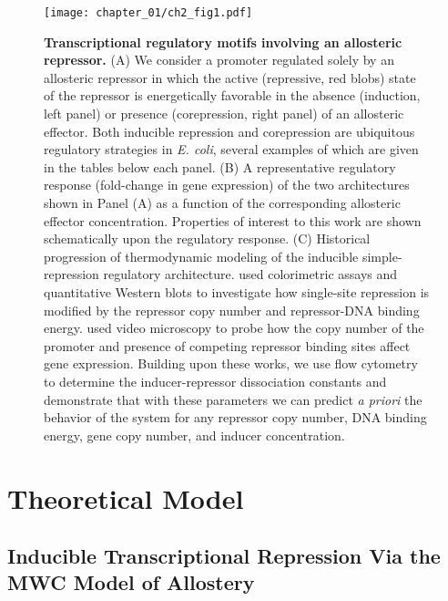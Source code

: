 \documentclass[12pt]{caltech_thesis}
\begin{document}
\hypertarget{fig:inducible_types}{%
\begin{figure}
\centering
\texttt{[image: chapter\_01/ch2\_fig1.pdf]}
\caption[{Transcriptional regulatory architectures involving an
allosteric repressor.}]{\textbf{Transcriptional regulatory motifs
involving an allosteric repressor.} (A) We consider a promoter regulated
solely by an allosteric repressor in which the active (repressive, red
blobs) state of the repressor is energetically favorable in the absence
(induction, left panel) or presence (corepression, right panel) of an
allosteric effector. Both inducible repression and corepression are
ubiquitous regulatory strategies in \emph{E. coli}, several examples of
which are given in the tables below each panel. (B) A representative
regulatory response (fold-change in gene expression) of the two
architectures shown in Panel (A) as a function of the corresponding
allosteric effector concentration. Properties of interest to this work
are shown schematically upon the regulatory response. (C) Historical
progression of thermodynamic modeling of the inducible simple-repression
regulatory architecture. \textcite{garcia2011} used colorimetric assays
and quantitative Western blots to investigate how single-site repression
is modified by the repressor copy number and repressor-DNA binding
energy. \textcite{brewster2014} used video microscopy to probe how the
copy number of the promoter and presence of competing repressor binding
sites affect gene expression. Building upon these works, we use flow
cytometry to determine the inducer-repressor dissociation constants and
demonstrate that with these parameters we can predict \emph{a priori}
the behavior of the system for any repressor copy number, DNA binding
energy, gene copy number, and inducer concentration.}
\label{fig:inducible_types}
\end{figure}
}

\hypertarget{theoretical-model}{%
\section{Theoretical Model}\label{theoretical-model}}

\hypertarget{inducible-transcriptional-repression-via-the-mwc-model-of-allostery}{%
\subsection{Inducible Transcriptional Repression Via the MWC Model of
Allostery}\label{inducible-transcriptional-repression-via-the-mwc-model-of-allostery}}
\end{document}
